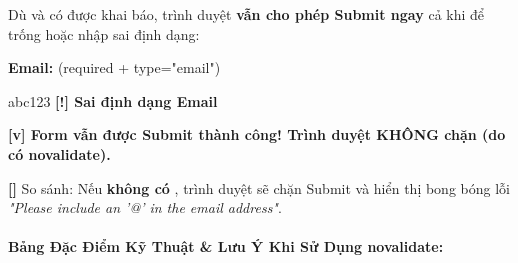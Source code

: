 \begin{browserWindow}
\sffamily\small
Dù  và  có được khai báo, trình duyệt \textbf{vẫn cho phép Submit ngay} cả khi để trống hoặc nhập sai định dạng:
\begin{tcolorbox}[colback=white, colframe=gray!30, arc=4pt, boxrule=0.8pt, left=12pt, right=12pt, top=10pt, bottom=10pt]
\textbf{\sffamily\small\textcolor{darkText}{Email:}} \hfill \textcolor{accentOrange}{\tiny (required + type="email")}\\[3pt]
\begin{tcolorbox}[colback=white, colframe=accentOrange!70, arc=3pt, boxrule=0.8pt, left=8pt, right=8pt, top=4pt, bottom=4pt]
\textcolor{darkText}{\sffamily\small abc123} \hfill \textcolor{accentOrange}{\tiny\bfseries [!] Sai định dạng Email}
\end{tcolorbox}
\vspace{6pt}
\begin{tcolorbox}[colback=tipBg, colframe=tipBorder, arc=3pt, boxrule=0.8pt, left=8pt, right=8pt, top=5pt, bottom=5pt]
\textcolor{tipBorder}{\sffamily\small\bfseries [v] Form vẫn được Submit thành công! Trình duyệt KHÔNG chặn (do có novalidate).}
\end{tcolorbox}
\end{tcolorbox}
\textcolor{primaryBlue}{\textbf{[\textrightarrow]}} So sánh: Nếu \textbf{không có} , trình duyệt sẽ chặn Submit và hiển thị bong bóng lỗi \textit{"Please include an '@' in the email address"}.
\end{browserWindow}

\paragraph{Bảng Đặc Điểm Kỹ Thuật \& Lưu Ý Khi Sử Dụng novalidate:}

